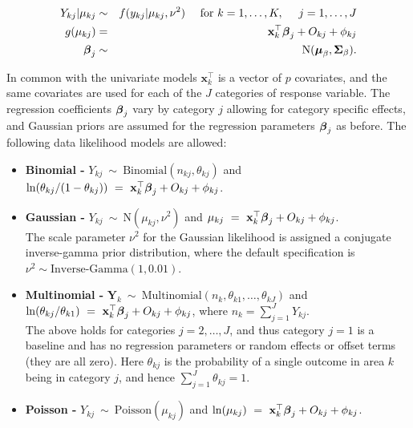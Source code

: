 \documentclass[article,shortnames,nojss]{jss}
\newcommand{\bd}[1]{\ensuremath{\mbox{\boldmath $#1$}}}
\begin{document}
\begin{eqnarray}
Y_{kj}|\mu_{kj}&\sim&f(y_{kj}|\mu_{kj}, \nu^2)~~~~\mbox{for }k=1,\ldots,K,~~~~ j=1,\ldots,J\label{equation MV likelihood}\\
g(\mu_{kj})&=& \mathbf{x}_{k}^{\top}\bd{\beta}_j + O_{kj} + \phi_{kj} \nonumber\\
\bd{\beta}_j&\sim&\mbox{N}(\bd{\mu}_{\beta}, \bd{\Sigma}_{\beta}).\nonumber
\end{eqnarray}

In common with the univariate models $\mathbf{x}_{k}^{\top}$ is a vector of $p$ covariates, and the same covariates are used for each of the $J$ categories of response variable. The regression coefficients $\bd{\beta}_j$ vary by category $j$ allowing for category specific effects, and Gaussian priors are assumed for the regression parameters $\bd{\beta}_j$ as before. The following data likelihood models are allowed:

\begin{itemize}
\item \textbf{Binomial - } $Y_{kj}~\sim~\mbox{Binomial}(n_{kj}, \theta_{kj})$ and $\ln(\theta_{kj}/(1-\theta_{kj}))~=~\mathbf{x}_{k}^{\top}\bd{\beta}_j + O_{kj} + \phi_{kj}$. 

\item \textbf{Gaussian - } $Y_{kj}~\sim~\mbox{N}(\mu_{kj}, \nu^2)$ and $\mu_{kj}~=~\mathbf{x}_{k}^{\top}\bd{\beta}_j + O_{kj} + \phi_{kj}$.\\

The scale parameter $\nu^2$ for the Gaussian likelihood is assigned a conjugate inverse-gamma prior distribution,  where the default specification is $\nu^{2}\sim\mbox{Inverse-Gamma}(1, 0.01)$.

\item \textbf{Multinomial - } $\mathbf{Y}_k~\sim~\mbox{Multinomial}(n_{k}, \theta_{k1},\ldots,\theta_{kJ})$ and $\ln(\theta_{kj}/\theta_{k1})~=~\mathbf{x}_{k}^{\top}\bd{\beta}_j + O_{kj} + \phi_{kj}$, where $n_k=\sum_{j=1}^{J}Y_{kj}$.\\

The above holds for categories $j=2,\ldots,J$, and thus category $j=1$ is a baseline and has no regression parameters or random effects or offset terms (they are all zero). Here $\theta_{kj}$ is the probability of a single outcome in area $k$ being in category $j$, and hence $\sum_{j=1}^{J}\theta_{kj}=1$.

\item \textbf{Poisson - } $Y_{kj}~\sim~\mbox{Poisson}(\mu_{kj})$ and $\ln(\mu_{kj})~=~\mathbf{x}_{k}^{\top}\bd{\beta}_j + O_{kj} + \phi_{kj}$. 
\end{itemize}
\end{document}
